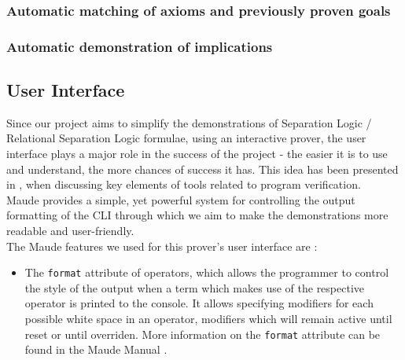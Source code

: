 \documentclass[12pt,a4paper]{article}
\begin{document}
{\subsubsection{Automatic matching of axioms and previously proven goals}
\subsubsection{Automatic demonstration of implications}
\subsection{User Interface}
Since our project aims to simplify the demonstrations of Separation Logic / Relational Separation Logic formulae, using an interactive prover, the user interface plays a major role in the success of the project - the easier it is to use and understand, the more chances of success it has. This idea has been presented in \cite{primer}, when discussing key elements of tools related to program verification. \\

Maude provides a simple, yet powerful system for controlling the output formatting of the CLI through which we aim to make the demonstrations more readable and user-friendly. \\

The Maude features we used for this prover's user interface are :
\begin{itemize}
	\item The \texttt{format} attribute of operators, which allows the programmer to control the style of the output when a term which makes use of the respective operator is printed to the console. It allows specifying modifiers for each possible white space in an operator, modifiers which will remain active until reset or until overriden. More information on the \texttt{format} attribute can be found in the Maude Manual \cite{manual}. 
	

\end{itemize}}
\end{document}
